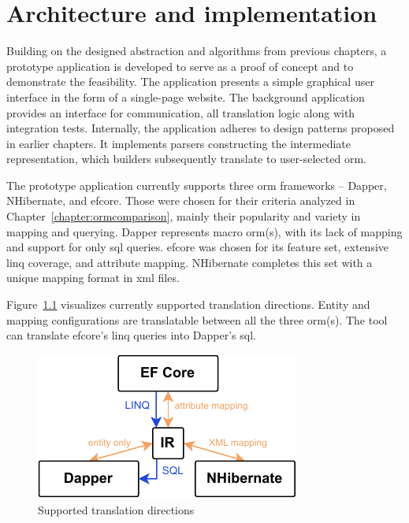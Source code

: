 \chapter{Architecture and implementation}

Building on the designed abstraction and algorithms from previous chapters, a prototype application is developed to serve as a proof of concept and to demonstrate the feasibility. The application presents a simple graphical user interface in the form of a single-page website. The background application provides an interface for communication, all translation logic along with integration tests. Internally, the application adheres to design patterns proposed in earlier chapters. It implements parsers constructing the intermediate representation, which builders subsequently translate to user-selected \acrshort{orm}.

The prototype application currently supports three \acrshort{orm} frameworks -- Dapper, NHibernate, and \acrshort{efcore}. Those were chosen for their criteria analyzed in Chapter~\ref{chapter:ormcomparison}, mainly their popularity and variety in mapping and querying. Dapper represents macro \acrshort{orm}(s), with its lack of mapping and support for only \acrshort{sql} queries. \acrshort{efcore} was chosen for its feature set, extensive \acrshort{linq} coverage, and attribute mapping. NHibernate completes this set with a unique mapping format in \acrshort{xml} files.

Figure~\ref{fig:supported_directions} visualizes currently supported translation directions. Entity and mapping configurations are translatable between all the three \acrshort{orm}(s). The tool can translate \acrshort{efcore}'s \acrshort{linq} queries into Dapper's \acrshort{sql}.

\begin{figure}[!htp]
  \centering
  \includegraphics[scale=1.5]{thesis/img/thesis/06_supported_directions.drawio.pdf}
  \caption{Supported translation directions}
  \label{fig:supported_directions}
\end{figure}

